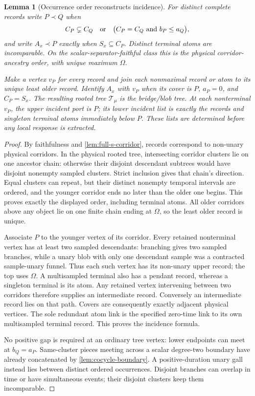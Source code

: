 \documentclass[11pt]{article}
\newtheorem{lemma}[theorem]{Lemma}
\begin{document}
\begin{lemma}[Occurrence order reconstructs incidence]
\label{lem:port-occurrence-incidence}
For distinct complete records write $P\prec Q$ when
\[
C_P\subsetneq C_Q
\quad\hbox{or}\quad
\bigl(C_P=C_Q\ \hbox{and}\ b_P\le a_Q\bigr),
\]
and write $A_x\prec P$ exactly when $S_x\subseteq C_P$.  Distinct terminal atoms are incomparable.  On the scalar-separator-faithful class this is the physical corridor-ancestry order, with unique maximum $\Omega$.

Make a vertex $v_P$ for every record and join each nonmaximal record or atom to its unique least older record.  Identify $A_x$ with $v_P$ when its cover is $P$, $a_P=0$, and $C_P=S_x$.  The resulting rooted tree $\mathcal T_\mu$ is the bridge/blob tree.  At each nonterminal $v_P$, the upper incident port is $P$; its lower incident list is exactly the records and singleton terminal atoms immediately below $P$.  These lists are determined before any local response is extracted.
\end{lemma}

\begin{proof}
By faithfulness and \cref{lem:full-s-corridor}, records correspond to non-unary physical corridors.  In the physical rooted tree, intersecting corridor clusters lie on one ancestor chain: otherwise their disjoint descendant subtrees would have disjoint nonempty sampled clusters.  Strict inclusion gives that chain's direction.  Equal clusters can repeat, but their distinct nonempty temporal intervals are ordered, and the younger corridor ends no later than the older one begins.  This proves exactly the displayed order, including terminal atoms.  All older corridors above any object lie on one finite chain ending at $\Omega$, so the least older record is unique.

Associate $P$ to the younger vertex of its corridor.  Every retained nonterminal vertex has at least two sampled descendants: branching gives two sampled branches, while a unary blob with only one descendant sample was a contracted sample-unary funnel.  Thus each such vertex has its non-unary upper record; the top uses $\Omega$.  A multisampled terminal also has a pendant record, whereas a singleton terminal is its atom.  Any retained vertex intervening between two corridors therefore supplies an intermediate record.  Conversely an intermediate record lies on that path.  Covers are consequently exactly adjacent physical vertices.  The sole redundant atom link is the specified zero-time link to its own multisampled terminal record.  This proves the incidence formula.

No positive gap is required at an ordinary tree vertex: lower endpoints can meet at $b_Q=a_P$.  Same-cluster pieces meeting across a scalar degree-two boundary have already concatenated by \cref{lem:cocycle-boundary}.  A positive-duration unary gall instead lies between distinct ordered occurrences.  Disjoint branches can overlap in time or have simultaneous events; their disjoint clusters keep them incomparable.
\end{proof}
\end{document}
